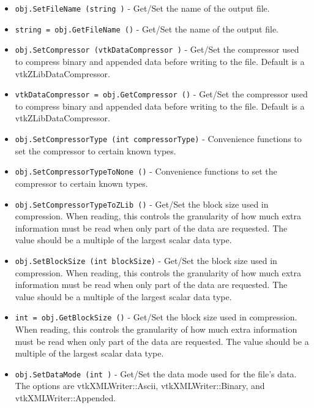\begin{itemize}
\item  \verb|obj.SetFileName (string )| -  Get/Set the name of the output file.

\item  \verb|string = obj.GetFileName ()| -  Get/Set the name of the output file.

\item  \verb|obj.SetCompressor (vtkDataCompressor )| -  Get/Set the compressor used to compress binary and appended data
 before writing to the file.  Default is a vtkZLibDataCompressor.

\item  \verb|vtkDataCompressor = obj.GetCompressor ()| -  Get/Set the compressor used to compress binary and appended data
 before writing to the file.  Default is a vtkZLibDataCompressor.

\item  \verb|obj.SetCompressorType (int compressorType)| -  Convenience functions to set the compressor to certain known types.

\item  \verb|obj.SetCompressorTypeToNone ()| -  Convenience functions to set the compressor to certain known types.

\item  \verb|obj.SetCompressorTypeToZLib ()| -  Get/Set the block size used in compression.  When reading, this
 controls the granularity of how much extra information must be
 read when only part of the data are requested.  The value should
 be a multiple of the largest scalar data type.

\item  \verb|obj.SetBlockSize (int blockSize)| -  Get/Set the block size used in compression.  When reading, this
 controls the granularity of how much extra information must be
 read when only part of the data are requested.  The value should
 be a multiple of the largest scalar data type.

\item  \verb|int = obj.GetBlockSize ()| -  Get/Set the block size used in compression.  When reading, this
 controls the granularity of how much extra information must be
 read when only part of the data are requested.  The value should
 be a multiple of the largest scalar data type.

\item  \verb|obj.SetDataMode (int )| -  Get/Set the data mode used for the file's data.  The options are
 vtkXMLWriter::Ascii, vtkXMLWriter::Binary, and
 vtkXMLWriter::Appended.


\end{itemize}
